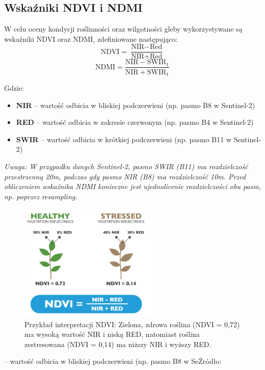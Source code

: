 \documentclass[12pt,a4paper]{article}
\begin{document}
\subsection{Wskaźniki NDVI i NDMI}
W celu oceny kondycji roślinności oraz wilgotności gleby wykorzystywane są wskaźniki NDVI oraz NDMI, zdefiniowane następująco:
\begin{equation}
\text{NDVI} = \frac{\text{NIR} - \text{Red}}{\text{NIR} + \text{Red}}
\end{equation}
\begin{equation}
\text{NDMI} = \frac{\text{NIR} - \text{SWIR}_1}{\text{NIR} + \text{SWIR}_1}
\end{equation}

\noindent
Gdzie:
\begin{itemize}[leftmargin=*]
    \item \textbf{NIR} -- wartość odbicia w bliskiej podczerwieni (np. pasmo B8 w Sentinel-2)
    \item \textbf{RED} -- wartość odbicia w zakresie czerwonym (np. pasmo B4 w Sentinel-2)
    \item \textbf{SWIR} -- wartość odbicia w krótkiej podczerwieni (np. pasmo B11 w Sentinel-2)
\end{itemize}

\noindent
\textit{Uwaga: W przypadku danych Sentinel-2, pasmo SWIR (B11) ma rozdzielczość przestrzenną 20m, podczas gdy pasmo NIR (B8) ma rozdzielczość 10m. Przed obliczeniem wskaźnika NDMI konieczne jest ujednolicenie rozdzielczości obu pasm, np. poprzez resampling.}

\begin{figure}[H]
    \centering
    \includegraphics[width=0.6\textwidth]{image.png}
    \caption{Przykład interpretacji NDVI: Zielona, zdrowa roślina (NDVI = 0{,}72) ma wysoką wartość NIR i niską RED, natomiast roślina zestresowana (NDVI = 0{,}14) ma niższy NIR i wyższy RED.}
    \label{fig:ndvi_example}
\end{figure}
\noindent
-- wartość odbicia w bliskiej podczerwieni (np. pasmo B8 w SeŹródło: \cite{agricolus_ndvi_img}
\end{document}
